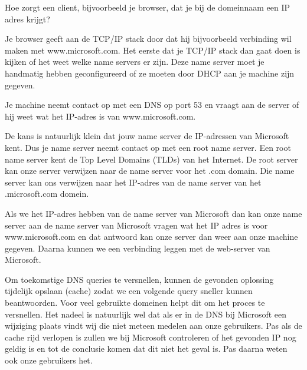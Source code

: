 Hoe zorgt een client, bijvoorbeeld je browser, dat je bij de domeinnaam een IP adres krijgt?

Je browser geeft aan de TCP/IP stack door dat hij bijvoorbeeld verbinding wil maken met www.microsoft.com. Het eerste dat je TCP/IP stack dan gaat doen is kijken of het weet welke name servers er zijn. Deze name server moet je handmatig hebben geconfigureerd of ze moeten door DHCP aan je machine zijn gegeven.

Je machine neemt contact op met een DNS op port 53 en vraagt aan de server of hij weet wat het IP-adres is van www.microsoft.com.

De kans is natuurlijk klein dat jouw name server de IP-adressen van Microsoft kent. Dus je name server neemt contact op met een root name server. Een root name server kent de Top Level Domains (TLDs) van het Internet. De root server kan onze server verwijzen naar de name server voor het .com domain. Die name server kan ons verwijzen naar het IP-adres van de name server van het .microsoft.com domein.

Als we het IP-adres hebben van de name server van Microsoft dan kan onze name server aan de name server van Microsoft vragen wat het IP adres is voor www.microsoft.com en dat antwoord kan onze server dan weer aan onze machine gegeven. Daarna kunnen we een verbinding leggen met de web-server van Microsoft.

Om toekomstige DNS queries te versnellen, kunnen de gevonden oplossing tijdelijk opslaan (cache) zodat we een volgende query sneller kunnen beantwoorden. Voor veel gebruikte domeinen helpt dit om het proces te versnellen. Het nadeel is natuurlijk wel dat als er in de DNS bij Microsoft een wijziging plaats vindt wij die niet meteen medelen aan onze gebruikers. Pas als de cache rijd verlopen is zullen we bij Microsoft controleren of het gevonden IP nog geldig is en tot de conclusie komen dat dit niet het geval is. Pas daarna weten ook onze gebruikers het.

